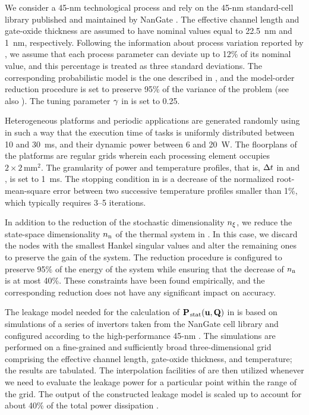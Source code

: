 We consider a 45-nm technological process and rely on the 45-nm standard-cell library published and maintained by NanGate \cite{nangate}.
The effective channel length and gate-oxide thickness are assumed to have nominal values equal to 22.5~nm and 1~nm, respectively.
Following the information about process variation reported by  \cite{itrs}, we assume that each process parameter can deviate up to 12\% of its nominal value, and this percentage is treated as three standard deviations.
The corresponding probabilistic model is the one described in , and the model-order reduction procedure is set to preserve 95\% of the variance of the problem (see also ).
The tuning parameter $\gamma$ in  is set to 0.25.

Heterogeneous platforms and periodic applications are generated randomly using  \cite{dick1998} in such a way that the execution time of tasks is uniformly distributed between 10 and 30~ms, and their dynamic power between 6 and 20~W.
The floorplans of the platforms are regular grids wherein each processing element occupies $2 \times 2\,\text{mm}^2$.
The granularity of power and temperature profiles, that is, $\Delta t$ in  and , is set to 1~ms.
The stopping condition in  is a decrease of the normalized root-mean-square error between two successive temperature profiles smaller than 1\%, which typically requires 3--5 iterations.

In addition to the reduction of the stochastic dimensionality ${n_\xi}$, we reduce the state-space dimensionality ${n_\text{n}}$ of the thermal system in .
In this case, we discard the nodes with the smallest Hankel singular values and alter the remaining ones to preserve the  gain of the system.
The reduction procedure is configured to preserve 95\% of the energy of the system while ensuring that the decrease of ${n_\text{n}}$ is at most 40\%.
These constraints have been found empirically, and the corresponding reduction does not have any significant impact on accuracy.

The leakage model needed for the calculation of $\mathbf{P}_{\text{\kern0.1emstat}}(\mathbf{u}, \mathbf{Q})$ in  is based on  simulations of a series of  invertors taken from the NanGate cell library and configured according to the high-performance 45-nm  \cite{ptm}.
The simulations are performed on a fine-grained and sufficiently broad three-dimensional grid comprising the effective channel length, gate-oxide thickness, and temperature; the results are tabulated.
The interpolation facilities of  \cite{matlab} are then utilized whenever we need to evaluate the leakage power for a particular point within the range of the grid.
The output of the constructed leakage model is scaled up to account for about 40\% of the total power dissipation \cite{liu2007}.
